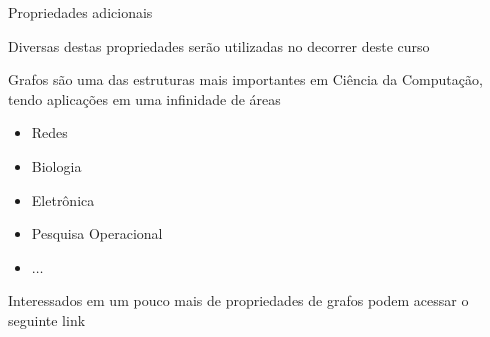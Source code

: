 \documentclass[compress,mathserif]{beamer}
\begin{document}
\begin{frame}{Propriedades adicionais}

Diversas destas propriedades serão utilizadas no decorrer deste curso

\vspace{0.5cm}

Grafos são uma das estruturas mais importantes em Ciência da Computação, tendo aplicações em uma infinidade de áreas
\begin{itemize}
    \item Redes
    \item Biologia
    \item Eletrônica
    \item Pesquisa Operacional
    \item $\ldots$ \href{https://www.ime.usp.br/~pf/algoritmos_para_grafos/aulas/large-examples.html}{} 
\end{itemize}

\vspace{0.5cm}

Interessados em um pouco mais de propriedades de grafos podem acessar o seguinte link \href{https://www.inf.ufsc.br/grafos/definicoes/definicao.html}{}

\end{frame}
\end{document}
